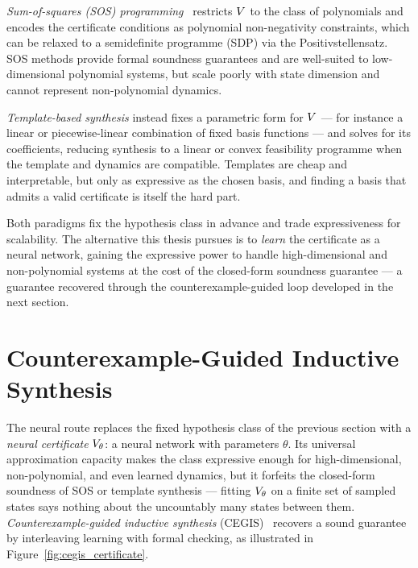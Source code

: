 \textit{Sum-of-squares (SOS) programming}~\cite{parrilo2000} restricts $V$ to
the class of polynomials and encodes the certificate conditions as polynomial
non-negativity constraints, which can be relaxed to a semidefinite programme
(SDP) via the Positivstellensatz. SOS methods provide formal soundness
guarantees and are well-suited to low-dimensional polynomial systems, but scale
poorly with state dimension and cannot represent non-polynomial dynamics.

\textit{Template-based synthesis} instead fixes a parametric form for $V$ ---
for instance a linear or piecewise-linear combination of fixed basis functions
--- and solves for its coefficients, reducing synthesis to a linear or convex
feasibility programme when the template and dynamics are compatible. Templates
are cheap and interpretable, but only as expressive as the chosen basis, and
finding a basis that admits a valid certificate is itself the hard part.

Both paradigms fix the hypothesis class in advance and trade expressiveness for
scalability. The alternative this thesis pursues is to \emph{learn} the
certificate as a neural network, gaining the expressive power to handle
high-dimensional and non-polynomial systems at the cost of the closed-form
soundness guarantee --- a guarantee recovered through the counterexample-guided
loop developed in the next section.


\section{Counterexample-Guided Inductive Synthesis}
\label{sec:cegis}

The neural route replaces the fixed hypothesis class of the previous section
with a \emph{neural certificate} $V_\theta$: a neural network with parameters
$\theta$. Its universal approximation capacity makes the class expressive enough
for high-dimensional, non-polynomial, and even learned dynamics, but it forfeits
the closed-form soundness of SOS or template synthesis --- fitting $V_\theta$
on a finite set of sampled states says nothing about the uncountably many states
between them. \emph{Counterexample-guided inductive synthesis}
(CEGIS)~\cite{chatterjee2023learnerverifier, abate2021fossil} recovers a sound
guarantee by interleaving learning with formal checking, as illustrated in
Figure~\ref{fig:cegis_certificate}.

